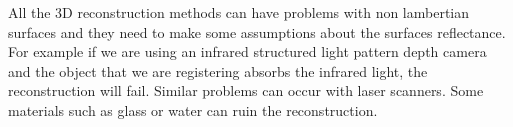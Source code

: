 All the 3D reconstruction methods can have problems with non lambertian 
surfaces and they need to make some assumptions about the surfaces reflectance. For example if we are using 
an infrared structured light pattern depth camera and the object that we are registering absorbs the infrared light, 
the reconstruction will fail. Similar problems can occur with laser scanners. 
Some materials such as glass or water can ruin the reconstruction.










